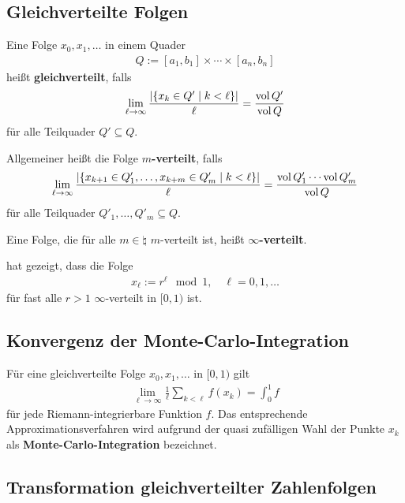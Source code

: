 \subsection{%
    Gleichverteilte Folgen%
}

Eine Folge $x_0, x_1, \dotsc$ in einem Quader
\begin{align*}
    Q := [a_1, b_1] \times \dotsb \times [a_n, b_n]
\end{align*}
heißt \textbf{gleichverteilt}, falls
\begin{align*}
    \lim_{\ell \to \infty} \frac{|\{x_k \in Q' \;|\; k < \ell\}|}{\ell}
    = \frac{\operatorname{vol} Q'}{\operatorname{vol} Q}
\end{align*}
für alle Teilquader $Q' \subseteq Q$.

Allgemeiner heißt die Folge \textbf{$m$-verteilt}, falls
\begin{align*}
    \lim_{\ell \to \infty} \frac{|\{x_{k+1} \in Q'_1, \dotsc, x_{k+m} \in Q'_m
    \;|\; k < \ell\}|}{\ell}
    = \frac{\operatorname{vol} Q'_1 \dotsm \operatorname{vol} Q'_m}{\operatorname{vol} Q}
\end{align*}
für alle Teilquader $Q'_1, \dotsc, Q'_m \subseteq Q$.

Eine Folge, die für alle $m \in \natural$ $m$-verteilt ist, heißt
\textbf{$\infty$-verteilt}.

\linie

 hat gezeigt, dass die Folge
\begin{align*}
    x_\ell := r^\ell \mod 1,\quad \ell = 0, 1, \dotsc
\end{align*}
für fast alle $r > 1$ $\infty$-verteilt in $[0, 1)$ ist.

\subsection{%
    Konvergenz der Monte-Carlo-Integration%
}

Für eine gleichverteilte Folge $x_0, x_1, \dotsc$ in $[0, 1)$ gilt
\begin{align*}
    \lim_{\ell \to \infty} \frac{1}{\ell} \sum_{k<\ell} f(x_k) = \int_0^1 f
\end{align*}
für jede Riemann-integrierbare Funktion $f$.
Das entsprechende Approximationsverfahren wird aufgrund der quasi zufälligen
Wahl der Punkte $x_k$ als \textbf{Monte-Carlo-Integration} bezeichnet.

\pagebreak

\subsection{%
    Transformation gleichverteilter Zahlenfolgen%
}

